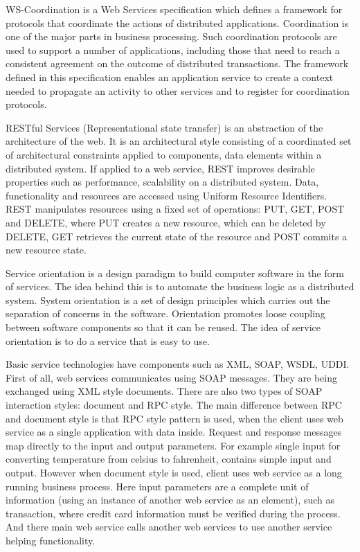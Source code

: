 WS-Coordination is a Web Services specification which defines a framework for protocols that coordinate the actions of distributed applications. Coordination is one of the major parts in business processing. Such coordination protocols are used to support a number of applications, including those that need to reach a consistent agreement on the outcome of distributed transactions. The framework defined in this specification enables an application service to create a context needed to propagate an activity to other services and to register for coordination protocols. 

RESTful Services (Representational state transfer) is an abstraction of the architecture of the web. It is an architectural style consisting of a coordinated set of architectural constraints applied to components, data elements within a distributed system. If applied to a web service, REST improves desirable properties such as performance, scalability on a distributed system. Data, functionality and resources are accessed using Uniform Resource Identifiers. REST manipulates resources using a fixed set of operations: PUT, GET, POST and DELETE, where PUT creates a new resource, which can be deleted by DELETE, GET retrieves the current state of the resource and POST commits a new resource state. 

Service orientation is a design paradigm to build computer software in the form of services. The idea behind this is to automate the business logic as a distributed system. System orientation is a set of design principles which carries out the separation of concerns in the software. Orientation promotes loose coupling between software components so that it can be reused. The idea of service orientation is to do a service that is easy to use. 

Basic service technologies have components such as XML, SOAP, WSDL, UDDI. First of all, web services communicates using SOAP messages. They are being exchanged using XML style documents. There are also two types of SOAP interaction styles: document and RPC style. The main difference between RPC and document style is that RPC style pattern is used, when the client uses web service as a single application with data inside. Request and response messages map directly to the input and output parameters. For example single input for converting temperature from celsius to fahrenheit, contains simple input and output. However when document style is used, client uses web service as a long running business process. Here input parameters are a complete unit of information (using an instance of another web service as an element), such as transaction, where credit card information must be verified during the process. And there main web service calls another web services to use another service helping functionality.

